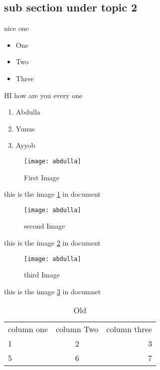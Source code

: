 \documentclass{article}
\begin{document}
\subsection{sub section under topic 2}
nice one
\newpage
\begin{landscape}
	\begin{itemize}
		\item One
		\item Two
		\item Three
	\end{itemize}

	HI how are you every one

	\begin{enumerate}
		\item{Abdulla}
		\item{Yunus}
		\item{Ayyob}
	\end{enumerate}

\end{landscape}
\newpage

\begin{figure}[h!]
	\centering
	\texttt{[image: abdulla]}
	\caption{First Image}
	\label{fig:123}
\end{figure}
this is the image \ref{fig:123} in document

\newpage

\begin{figure}[t!]
	\begin{center}
	\texttt{[image: abdulla]}
	\caption{second Image}
	\label{fig:456}
	\end{center}
\end{figure}

this is the image \ref{fig:456} in document
\newpage

\begin{figure}[b!]
	\begin{flushright}
	\texttt{[image: abdulla]}
	\caption{third Image}
	\label{fig:789}
	\end{flushright}
	
\end{figure}

this is the image \ref{fig:789} in documnet

\newpage

\begin{table}
	\begin{tabular}{lcr}
		column one & column Two & column three \\
		1 & 2 & 3\\
		5 & 6 & 7\\
	\end{tabular}
	\caption{Old}
	\label{tab:123}
\end{table}
	
\end{document}
